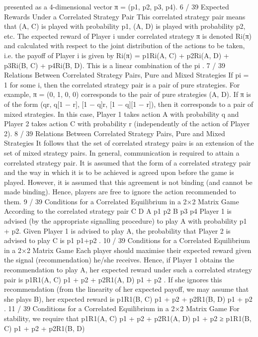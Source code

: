 presented as a 4-dimensional vector π = (p1, p2, p3, p4).
6 / 39
Expected Rewards Under a Correlated Strategy Pair
This correlated strategy pair means that (A, C) is played with
probability p1, (A, D) is played with probability p2, etc.
The expected reward of Player i under correlated strategy π is
denoted Ri(π) and calculated with respect to the joint distribution
of the actions to be taken, i.e. the payoff of Player i is given by
Ri(π) = p1Ri(A, C) + p2Ri(A, D) + p3Ri(B, C) + p4Ri(B, D).
This is a linear combination of the pi
.
7 / 39
Relations Between Correlated Strategy Pairs, Pure and
Mixed Strategies
If pi = 1 for some i, then the correlated strategy pair is a pair of
pure strategies.
For example, π = (0, 1, 0, 0) corresponds to the pair of pure
strategies (A, D).
If π is of the form (qr, q[1 − r], [1 − q]r, [1 − q][1 − r]), then it
corresponds to a pair of mixed strategies.
In this case, Player 1 takes action A with probability q and Player
2 takes action C with probability r (independently of the action of
Player 2).
8 / 39
Relations Between Correlated Strategy Pairs, Pure and
Mixed Strategies
It follows that the set of correlated strategy pairs is an extension of
the set of mixed strategy pairs.
In general, communication is required to attain a correlated
strategy pair.
It is assumed that the form of a correlated strategy pair and the
way in which it is to be achieved is agreed upon before the game is
played.
However, it is assumed that this agreement is not binding (and
cannot be made binding). Hence, players are free to ignore the
action recommended to them.
9 / 39
Conditions for a Correlated Equilibrium in a 2×2 Matrix
Game
According to the correlated strategy pair
C D
A p1 p2
B p3 p4
Player 1 is advised (by the appropriate signalling procedure) to play
A with probability p1 + p2. Given Player 1 is advised to play A, the
probability that Player 2 is advised to play C is p1
p1+p2
.
10 / 39
Conditions for a Correlated Equilibrium in a 2×2 Matrix
Game
Each player should maximise their expected reward given the signal
(recommendation) he/she receives.
Hence, if Player 1 obtains the recommendation to play A, her
expected reward under such a correlated strategy pair is
p1R1(A, C)
p1 + p2
+
p2R1(A, D)
p1 + p2
.
If she ignores this recommendation (from the linearity of her
expected payoff, we may assume that she plays B), her expected
reward is
p1R1(B, C)
p1 + p2
+
p2R1(B, D)
p1 + p2
.
11 / 39
Conditions for a Correlated Equilibrium in a 2×2 Matrix
Game
For stability, we require that
p1R1(A, C)
p1 + p2
+
p2R1(A, D)
p1 + p2
≥
p1R1(B, C)
p1 + p2
+
p2R1(B, D)
